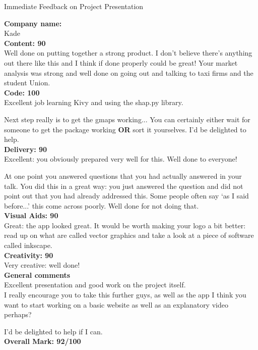 \documentclass{article}
\begin{document}
\begin{center}
\Huge{Immediate Feedback on Project Presentation}\\
\end{center}


\normalsize
\textbf{Company name:}\\

Kade \\

\textbf{Content: 90}\\

Well done on putting together a strong product.
I don't believe there's anything out there like this and I think if done properly could be great!
Your market analysis was strong and well done on going out and talking to taxi firms and the student Union.\\

\textbf{Code: 100}\\

Excellent job learning Kivy and using the shap.py library.

Next step really is to get the gmaps working...
You can certainly either wait for someone to get the package working \textbf{OR} sort it yourselves.
I'd be delighted to help.\\

\textbf{Delivery: 90}\\

Excellent: you obviously prepared very well for this.
Well done to everyone!

At one point you answered questions that you had actually answered in your talk.
You did this in a great way: you just answered the question and did not point out that you had already addressed this.
Some people often say `as I said before...' this come across poorly.
Well done for not doing that.\\

\textbf{Visual Aids: 90}\\

Great: the app looked great.
It would be worth making your logo a bit better: read up on what are called vector graphics and take a look at a piece of software called inkscape.\\

\textbf{Creativity: 90}\\

Very creative: well done!\\


\textbf{General comments}\\

Excellent presentation and good work on the project itself.\\

I really encourage you to take this further guys, as well as the app I think you want to start working on a basic website as well as an explanatory video perhaps?

I'd be delighted to help if I can.\\

\textbf{Overall Mark: 92/100}
\end{document}
